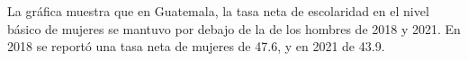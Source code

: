 La gráfica muestra que en Guatemala, la tasa neta de escolaridad en el nivel básico de mujeres se mantuvo por debajo de la de los hombres de 2018 y 2021. En 2018 se reportó una tasa neta de mujeres de 47.6, y en 2021 de 43.9.